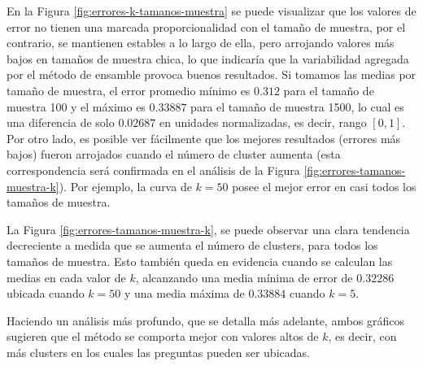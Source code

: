 \bigskip En la Figura \ref{fig:errores-k-tamanos-muestra} se puede visualizar que los valores de error no tienen una marcada proporcionalidad con el tamaño de muestra, por el contrario, se mantienen estables a lo largo de ella, pero arrojando valores más bajos en tamaños de muestra chica, lo que indicaría que la variabilidad agregada por el método de ensamble provoca buenos resultados. Si tomamos las medias por tamaño de muestra, el error promedio mínimo es \(0.312\) para el tamaño de muestra 100 y el máximo es \(0.33887\) para el tamaño de muestra 1500, lo cual es una diferencia de solo \(0.02687\) en unidades normalizadas, es decir, rango \([0, 1]\). Por otro lado, es posible ver fácilmente que los mejores resultados (errores más bajos) fueron arrojados cuando el número de cluster aumenta (esta correspondencia será confirmada en el análisis de la Figura \ref{fig:errores-tamanos-muestra-k}). Por ejemplo, la curva de \(k = 50\) posee el mejor error en casi todos los tamaños de muestra.

\bigskip La Figura \ref{fig:errores-tamanos-muestra-k}, se puede observar una clara tendencia decreciente a medida que se aumenta el número de clusters, para todos los tamaños de muestra. Esto también queda en evidencia cuando se calculan las medias en cada valor de \(k\), alcanzando una media mínima de error de \(0.32286\) ubicada cuando \(k = 50\) y una media máxima de \(0.33884\) cuando \(k = 5\).

\bigskip Haciendo un análisis más profundo, que se detalla más adelante, ambos gráficos sugieren que el método se comporta mejor con valores altos de \(k\), es decir, con más clusters en los cuales las preguntas pueden ser ubicadas.
